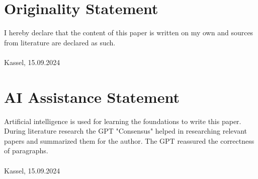 \section{Originality Statement}
I hereby declare that the content of this paper is written on my own and sources from literature are declared as such.\vspace{2cm}\\
\underline{\hspace{10cm}}\\
\footnotesize Kassel, 15.09.2024 \normalsize
\section{AI Assistance Statement}
Artificial intelligence is used for learning the foundations to write this paper. During literature research the GPT "Consensus" helped in researching relevant papers and summarized them for the author. The GPT reassured the correctness of paragraphs.\vspace{2cm}\\
\underline{\hspace{10cm}}\\
\footnotesize Kassel, 15.09.2024 \normalsize
